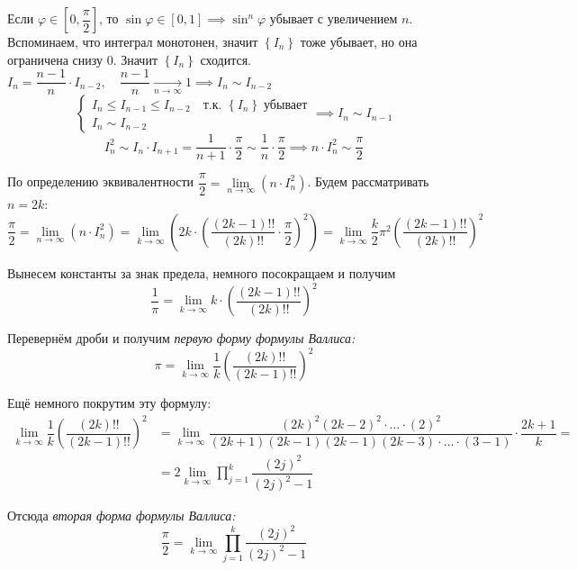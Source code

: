 \documentclass[../main.tex]{subfiles}
\begin{document}
Если \( \varphi \in \left[ 0, \dfrac{ \pi}{ 2}  \right]\), то \( \sin \varphi \in \left[ 0, 1\right] \implies \sin^n \varphi \) убывает с увеличением \( n\). Вспоминаем, что интеграл монотонен, значит \( \left\{ I_n\right\}\) тоже убывает, но она ограничена снизу 0. 
Значит \( \left\{ I_n\right\}\) сходится. \( I_n = \dfrac{ n-1}{ n} \cdot I_{n-2},\quad \dfrac{ n-1}{ n} \underset{n \rightarrow \infty }{\longrightarrow} 1 \implies I_n \sim I_{n-2}\)
\begin{equation*}
    \begin{cases}
        I_n \leq I_{n-1} \leq I_{n-2}\quad \text{т.к. } \left\{ I_n\right\}\;\text{убывает}\\ 
        I_n \sim I_{n-2}
    \end{cases}
    \implies 
    I_n \sim I_{n-1}
\end{equation*}
\[ I_n^2 \sim I_n \cdot I_{n+1}= \dfrac{ 1}{ n+1} \cdot \dfrac{ \pi}{ 2} \sim \dfrac{ 1}{ n} \cdot \dfrac{ \pi}{ 2} \implies n \cdot I_n^2 \sim \dfrac{ \pi}{ 2}   \]

По определению эквивалентности \( \dfrac{ \pi}{ 2} = \lim\limits_{ n\rightarrow \infty } \left( n \cdot I_n^2\right) \). Будем рассматривать \( n=2k\):
\[ \dfrac{ \pi}{ 2} = \lim\limits_{ n\rightarrow \infty } \left( n \cdot I_n^2\right)= \lim\limits_{ k\rightarrow \infty } \left( 2k \cdot \left( \dfrac{ (2k-1)!!}{ (2k)!!} \cdot \dfrac{ \pi}{ 2}  \right)^2\right)= \lim\limits_{ k\rightarrow \infty } \dfrac{ k}{ 2} \pi ^2\left( \dfrac{ (2k-1)!!}{ (2k)!!} \right)^2\]

Вынесем константы за знак предела, немного посокращаем и получим 
\[ \dfrac{ 1}{ \pi } = \lim\limits_{ k\rightarrow \infty } k \cdot \left( \dfrac{ (2k-1)!!}{ (2k)!!} \right)^2\]

Перевернём дроби и получим \emph{первую форму формулы Валлиса:}
\[ \boxed{ \pi = \lim\limits_{ k \rightarrow \infty } \dfrac{ 1}{ k} \left( \dfrac{ (2k)!!}{ (2k-1)!!} \right)^2}\]

Ещё немного покрутим эту формулу: 
\begin{equation*}
    \begin{aligned}
        \lim\limits_{ k \rightarrow \infty } \dfrac{ 1}{ k} \left( \dfrac{ (2k)!!}{ (2k-1)!!} \right)^2&= \lim\limits_{ k\rightarrow \infty } \dfrac{ (2k)^2(2k-2)^2\cdot\ldots\cdot(2)^2}{ (2k+1)(2k-1)(2k-1)(2k-3)\cdot\ldots\cdot(3-1)} \cdot \dfrac{ 2k+1}{ k} =\\
        &= 2 \lim\limits_{ k\rightarrow \infty } \displaystyle\prod\limits_{j=1}^k \dfrac{ (2j)^2}{ (2j)^2-1} 
    \end{aligned}
\end{equation*}

Отсюда \emph{вторая форма формулы Валлиса:}
\[ \boxed{ \dfrac{ \pi}{ 2} =\lim\limits_{ k\rightarrow \infty } \displaystyle\prod\limits_{j=1}^k \dfrac{ (2j)^2}{ (2j)^2-1} }\] 
\end{document}
